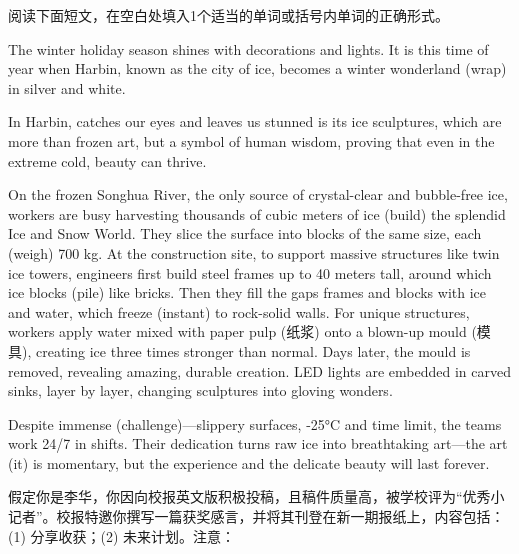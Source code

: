 \documentclass{英语试卷}
\begin{document}
\par 阅读下面短文，在空白处填入1个适当的单词或括号内单词的正确形式。\par
\par The winter holiday season shines with decorations and lights. It is this time of year when Harbin, known as the city of ice, becomes a winter wonderland  (wrap) in silver and white.\par
\par In Harbin,  catches our eyes and leaves us stunned is its ice sculptures, which are more than frozen art, but a symbol of human wisdom, proving that even in the extreme cold, beauty can thrive.\par
\par On the frozen Songhua River, the only source of crystal-clear and bubble-free ice, workers are busy harvesting thousands of cubic meters of ice  (build) the splendid Ice and Snow World. They slice the surface into blocks of the same size, each  (weigh) 700 kg. At the construction site, to support massive structures like twin ice towers, engineers first build steel frames up to 40 meters tall, around which ice blocks  (pile) like bricks. Then they fill the gaps  frames and blocks with ice and water, which freeze  (instant) to rock-solid walls. For unique structures, workers apply water mixed with paper pulp (纸浆) onto a blown-up mould (模具), creating ice three times stronger than normal. Days later, the mould is removed, revealing  amazing, durable creation. LED lights are embedded in carved sinks, layer by layer, changing sculptures into gloving wonders.\par
\par Despite immense  (challenge)—slippery surfaces, -25°C and time limit, the teams work 24/7 in shifts. Their dedication turns raw ice into breathtaking art—the art  (it) is momentary, but the experience and the delicate beauty will last forever.\par
{}
\par 假定你是李华，你因向校报英文版积极投稿，且稿件质量高，被学校评为“优秀小记者”。校报特邀你撰写一篇获奖感言，并将其刊登在新一期报纸上，内容包括：(1) 分享收获；(2) 未来计划。注意：\par
\end{document}
